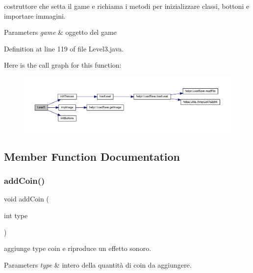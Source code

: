 costruttore che setta il game e richiama i metodi per inizializzare classi, bottoni e importare immagini. 


\begin{DoxyParams}{Parameters}
{\em game} & oggetto del game \\
\hline
\end{DoxyParams}


Definition at line 119 of file Level3.\+java.

Here is the call graph for this function\+:
\nopagebreak
\begin{figure}[H]
\begin{center}
\leavevmode
\includegraphics[width=350pt]{classscenes_1_1_level3_a0f56949b20e6eda500c5b9c50e16de58_cgraph}
\end{center}
\end{figure}


\subsection{Member Function Documentation}
\mbox{\label{classscenes_1_1_level3_a9f0f7dc28e596d2ebcd06e27ef05d9fd}} 
\subsubsection{\texorpdfstring{add\+Coin()}{addCoin()}}
{\footnotesize\ttfamily void add\+Coin (\begin{DoxyParamCaption}\item[{int}]{type }\end{DoxyParamCaption})}



aggiunge \textquotesingle{}type\textquotesingle{} coin e riproduce un effetto sonoro. 


\begin{DoxyParams}{Parameters}
{\em type} & intero della quantità di coin da aggiungere. \\
\hline
\end{DoxyParams}


